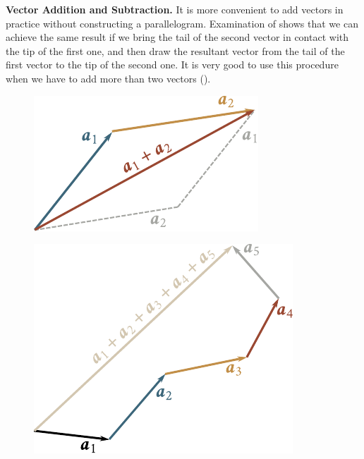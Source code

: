\textbf{Vector Addition and Subtraction.} It is more convenient to add vectors in practice without constructing a parallelogram. Examination of  shows that we can achieve the same result if we bring the tail of the second vector in contact with the tip of the first one, and then draw the resultant vector from the tail of the first vector to the tip of the second one. It is very good to use this procedure when we have to add more than two vectors ().

\begin{figure}[t]
	\begin{minipage}[t]{0.5\linewidth}
		\begin{center}
			\includegraphics[scale=0.95]{figures/ch_01/fig_1_5.pdf}
			\caption[]{}
			\label{fig:1_5}
		\end{center}
	\end{minipage}
	\hfill{ }%
	\begin{minipage}[t]{0.5\linewidth}
		\begin{center}
			\includegraphics[scale=0.95]{figures/ch_01/fig_1_6.pdf}
			\caption[]{}
			\label{fig:1_6}
		\end{center}
	\end{minipage}
\vspace{-0.7cm}
\end{figure}

